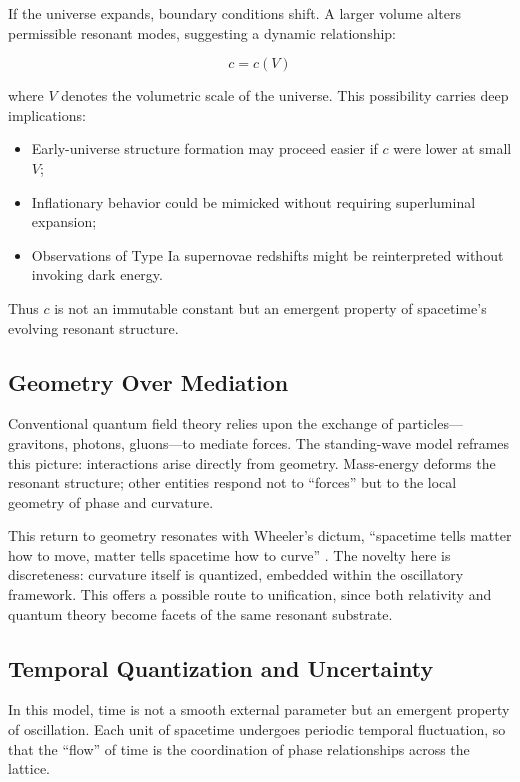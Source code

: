 \documentclass[12pt]{article}
\begin{document}
If the universe expands, boundary conditions shift. A larger volume alters permissible resonant modes, suggesting a dynamic relationship:

\[
c = c(V)
\]

where \( V \) denotes the volumetric scale of the universe. This possibility carries deep implications:

\begin{itemize}
  \item Early-universe structure formation may proceed easier if \( c \) were lower at small \( V \);
  \item Inflationary behavior could be mimicked without requiring superluminal expansion;
  \item Observations of Type Ia supernovae redshifts \cite{perlmutter1999,riess1998} might be reinterpreted without invoking dark energy.
\end{itemize}

Thus \( c \) is not an immutable constant but an emergent property of spacetime’s evolving resonant structure.

\subsection{Geometry Over Mediation}

Conventional quantum field theory relies upon the exchange of particles---gravitons, photons, gluons---to mediate forces. The standing-wave model reframes this picture: interactions arise directly from geometry. Mass-energy deforms the resonant structure; other entities respond not to “forces” but to the local geometry of phase and curvature. 

This return to geometry resonates with Wheeler’s dictum, “spacetime tells matter how to move, matter tells spacetime how to curve” \cite{misner1973}. The novelty here is discreteness: curvature itself is quantized, embedded within the oscillatory framework. This offers a possible route to unification, since both relativity and quantum theory become facets of the same resonant substrate.

\subsection{Temporal Quantization and Uncertainty}

In this model, time is not a smooth external parameter but an emergent property of oscillation. Each unit of spacetime undergoes periodic temporal fluctuation, so that the “flow” of time is the coordination of phase relationships across the lattice. 
\end{document}
